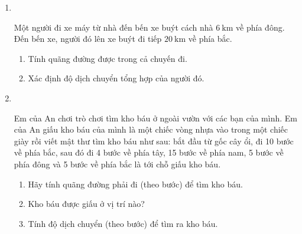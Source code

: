 \begin{enumerate}[label=\bfseries Bài \arabic*:,leftmargin=1.5cm]
{}

\item {}\\
{Một người đi xe máy từ nhà đến bến xe buýt cách nhà $\SI{6}{\kilo\meter}$ về phía đông. Đến bến xe, người đó lên xe buýt đi tiếp $\SI{20}{\kilo\meter}$ về phía bắc.
\begin{enumerate}[label=\alph*)]
	\item Tính quãng đường được trong cả chuyến đi.
	\item Xác định độ dịch chuyển tổng hợp của người đó.
\end{enumerate}
}


\item {}\\
{Em của An chơi trò chơi tìm kho báu ở ngoài vườn với các bạn của mình. Em của An giấu kho báu của mình là một chiếc vòng nhựa vào trong một chiếc giày rồi viết mật thư tìm kho báu như sau: bắt đầu từ gốc cây ổi, đi 10 bước về phía bắc, sau đó đi 4 bước về phía tây, 15 bước về phía nam, 5 bước về phía đông và 5 bước về phía bắc là tới chỗ giấu kho báu.
	\begin{enumerate}[label=\alph*)]
		\item Hãy tính quãng đường phải đi (theo bước) để tìm kho báu.
		\item Kho báu được giấu ở vị trí nào?
		\item Tính độ dịch chuyển (theo bước) để tìm ra kho báu.
	\end{enumerate}

}



\end{enumerate}
